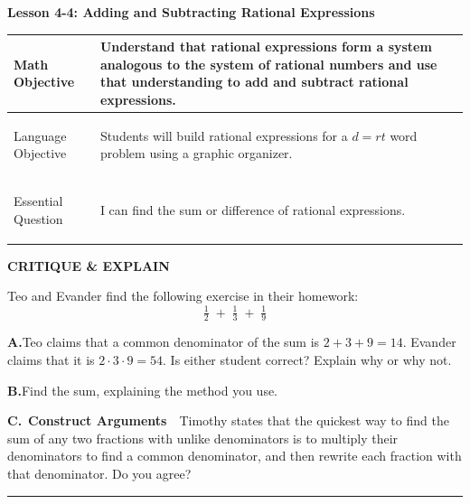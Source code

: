 \documentclass[11pt]{article}
\begin{document}
\begin{center}
  {\LARGE\bfseries Lesson 4-4: Adding and Subtracting Rational Expressions}
\end{center}

\renewcommand{\arraystretch}{1.3}
\begin{tabularx}{\textwidth}{|>{\bfseries\raggedright\arraybackslash}p{3.4cm}|X|}
\hline
Math Objective & Understand that rational expressions form a system analogous to
the system of rational numbers and use that understanding to add and subtract
rational expressions. \\ \hline
Language Objective & Students will build rational expressions for a $d=rt$ word
problem using a graphic organizer. \\ \hline
Essential Question & I can find the sum or difference of rational expressions. \\ \hline
\end{tabularx}
\renewcommand{\arraystretch}{1.0}

\bigskip
{\large\bfseries\color{accentblue}CRITIQUE \& EXPLAIN}

Teo and Evander find the following exercise in their homework:
\[ \tfrac{1}{2} \;+\; \tfrac{1}{3} \;+\; \tfrac{1}{9} \]

\textbf{A.}\quad Teo claims that a common denominator of the sum is
$2+3+9 = 14$. Evander claims that it is $2\cdot 3 \cdot 9 = 54$. Is either
student correct? Explain why or why not.
\vspace{2.2cm}

\textbf{B.}\quad Find the sum, explaining the method you use.
\vspace{2.2cm}

\textbf{C.}\ \textcolor{accentred}{\textbf{Construct Arguments}}\ \
Timothy states that the quickest way to find the sum of any two fractions with
unlike denominators is to multiply their denominators to find a common
denominator, and then rewrite each fraction with that denominator. Do you agree?
\vspace{2.2cm}

\noindent\rule{\textwidth}{0.3pt}
\end{document}
